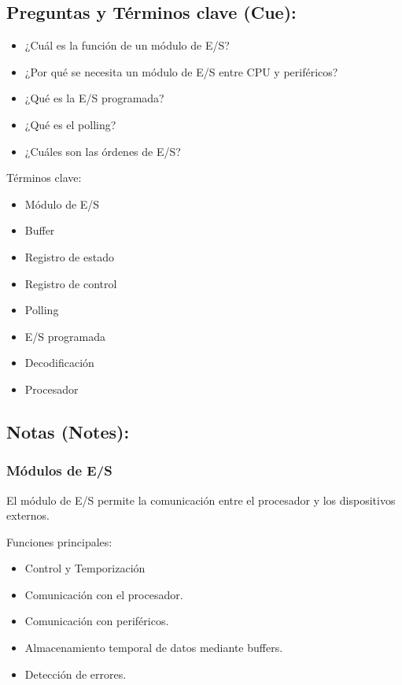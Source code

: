 \documentclass{article}
\begin{document}
\subsection{Preguntas y Términos clave (Cue):}
\label{sec:orgcdf5c40}
\begin{itemize}
\item ¿Cuál es la función de un módulo de E/S?
\item ¿Por qué se necesita un módulo de E/S entre CPU y periféricos?
\item ¿Qué es la E/S programada?
\item ¿Qué es el polling?
\item ¿Cuáles son las órdenes de E/S?
\end{itemize}

Términos clave:
\begin{itemize}
\item Módulo de E/S
\item Buffer
\item Registro de estado
\item Registro de control
\item Polling
\item E/S programada
\item Decodificación
\item Procesador
\end{itemize}

\subsection{Notas (Notes):}
\label{sec:org0a029bd}

\subsubsection{Módulos de E/S}
\label{sec:orgd17df73}

El módulo de E/S permite la comunicación entre el procesador y los
dispositivos externos.

Funciones principales:
\begin{itemize}
\item Control y Temporización
\item Comunicación con el procesador.
\item Comunicación con periféricos.
\item Almacenamiento temporal de datos mediante buffers.
\item Detección de errores.
\end{itemize}
\end{document}
